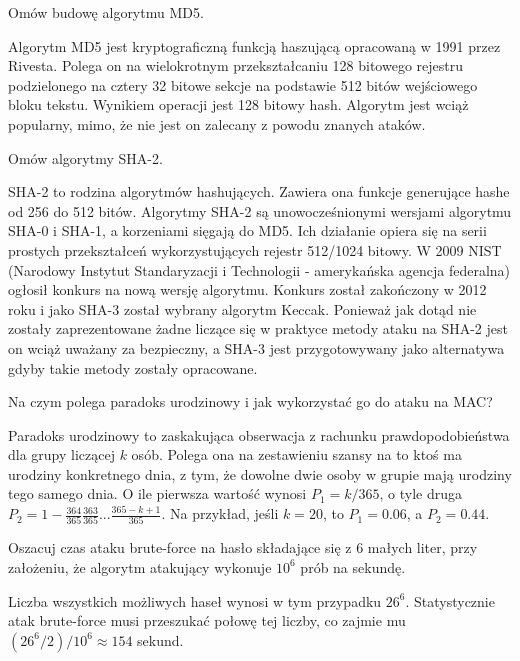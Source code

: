 \documentclass[answers,11pt]{exam}
\begin{document}
\begin{questions}
\question Omów budowę algorytmu MD5.
\begin{solution}
Algorytm MD5 jest kryptograficzną funkcją haszującą opracowaną w 1991 przez Rivesta. Polega on na wielokrotnym przekształcaniu 128 bitowego rejestru podzielonego na cztery 32 bitowe sekcje na podstawie 512 bitów wejściowego bloku tekstu. Wynikiem operacji jest 128 bitowy hash. Algorytm jest wciąż popularny, mimo, że nie jest on zalecany z powodu znanych ataków.
\end{solution}

\question Omów algorytmy SHA-2.
\begin{solution}
SHA-2 to rodzina algorytmów hashujących. Zawiera ona funkcje generujące hashe od 256 do 512 bitów. Algorytmy SHA-2 są unowocześnionymi wersjami algorytmu SHA-0 i SHA-1, a korzeniami sięgają do MD5. Ich działanie opiera się na serii prostych przekształceń wykorzystujących rejestr 512/1024 bitowy. W 2009 NIST (Narodowy Instytut Standaryzacji i Technologii - amerykańska agencja federalna) ogłosił konkurs na nową wersję algorytmu. Konkurs został zakończony w 2012 roku i jako SHA-3 został wybrany algorytm Keccak. Ponieważ jak dotąd nie zostały zaprezentowane żadne liczące się w praktyce metody ataku na SHA-2 jest on wciąż uważany za bezpieczny, a SHA-3 jest przygotowywany jako alternatywa gdyby takie metody zostały opracowane.
\end{solution}

\question Na czym polega paradoks urodzinowy i jak wykorzystać go do ataku na MAC?
\begin{solution}
Paradoks urodzinowy to zaskakująca obserwacja z rachunku prawdopodobieństwa dla grupy liczącej  $k$ osób. Polega ona na zestawieniu szansy na to ktoś ma urodziny konkretnego dnia, z tym, że dowolne dwie osoby w grupie mają urodziny tego samego dnia. O ile pierwsza wartość wynosi $P_1 = k/365$, o tyle druga $P_2 = 1 - \frac{364}{365}\frac{363}{365} ... \frac{365-k+1}{365}$. 
Na przykład, jeśli $k=20$, to $P_1 = 0.06$, a $P_2 = 0.44$. 
\end{solution}

\question Oszacuj czas ataku brute-force na hasło składające się z 6 małych liter, przy założeniu, że algorytm atakujący wykonuje $10^6$ prób na sekundę.
\begin{solution}
Liczba wszystkich możliwych haseł wynosi w tym przypadku $26^6$. Statystycznie atak brute-force musi przeszukać połowę tej liczby, co zajmie mu $(26^6 / 2 ) / 10^6 \approx 154$ sekund.
\end{solution}


\end{questions}
\end{document}
